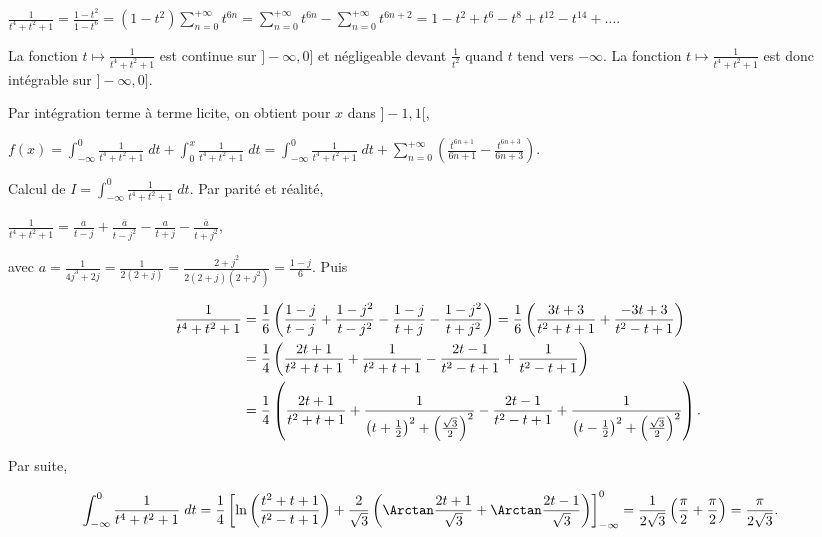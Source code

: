 {{\begin{center}
$\frac{1}{t^4+t^2+1}=\frac{1-t^2}{1-t^6}=(1-t^2)\sum_{n=0}^{+\infty}t^{6n}=\sum_{n=0}^{+\infty}t^{6n}-\sum_{n=0}^{+\infty}t^{6n+2}=1-t^2+t^6-t^8+t^{12}-t^{14}+\ldots$.
\end{center}

La fonction $t\mapsto\frac{1}{t^4+t^2+1}$ est continue sur $]-\infty,0]$ et négligeable devant $\frac{1}{t^2}$ quand $t$ tend vers $-\infty$. La fonction $t\mapsto\frac{1}{t^4+t^2+1}$ est donc intégrable sur $]-\infty,0]$.

Par intégration terme à terme licite, on obtient pour $x$ dans $]-1,1[$,

\begin{center}
$f(x)=\int_{-\infty}^{0}\frac{1}{t^4+t^2+1}\;dt+\int_{0}^{x}\frac{1}{t^4+t^2+1}\;dt=\int_{-\infty}^{0}\frac{1}{t^4+t^2+1}\;dt+\sum_{n=0}^{+\infty}\left(\frac{t^{6n+1}}{6n+1}-\frac{t^{6n+3}}{6n+3}\right)$.
\end{center}

Calcul de $I=\int_{-\infty}^{0}\frac{1}{t^4+t^2+1}\;dt$. Par parité et réalité,

\begin{center}
$\frac{1}{t^4+t^2+1}=\frac{a}{t-j}+\frac{\overline{a}}{t-j^2}-\frac{a}{t+j}-\frac{\overline{a}}{t+j^2}$,
\end{center}

avec $a=\frac{1}{4j^3+2j}=\frac{1}{2(2+j)}=\frac{2+j^2}{2(2+j)(2+j^2)}=\frac{1-j}{6}$.
Puis

\begin{align*}\ensuremath
\frac{1}{t^4+t^2+1}&=\frac{1}{6}\left(\frac{1-j}{t-j}+\frac{1-j^2}{t-j^2}-\frac{1-j}{t+j}-\frac{1-j^2}{t+j^2}\right)=\frac{1}{6}\left(\frac{3t+3}{t^2+t+1}+\frac{-3t+3}{t^2-t+1}\right)\\
 &=\frac{1}{4}\left(\frac{2t+1}{t^2+t+1}+\frac{1}{t^2+t+1}-\frac{2t-1}{t^2-t+1}+\frac{1}{t^2-t+1}\right)\\
 &=\frac{1}{4}\left(\frac{2t+1}{t^2+t+1}+\frac{1}{\left(t+\frac{1}{2}\right)^2+\left(\frac{\sqrt{3}}{2}\right)^2}-\frac{2t-1}{t^2-t+1}+\frac{1}{\left(t-\frac{1}{2}\right)^2+\left(\frac{\sqrt{3}}{2}\right)^2}\right).
\end{align*}

Par suite,

\begin{align*}\ensuremath
\int_{-\infty}^{0}\frac{1}{t^4+t^2+1}\;dt&=\frac{1}{4}\left[\ln\left(\frac{t^2+t+1}{t^2-t+1}\right)+\frac{2}{\sqrt{3}}\left(\Arctan\frac{2t+1}{\sqrt{3}}+\Arctan\frac{2t-1}{\sqrt{3}}\right)\right]_{-\infty}^0=\frac{1}{2\sqrt{3}}\left(\frac{\pi}{2}+\frac{\pi}{2}\right)=\frac{\pi}{2\sqrt{3}}.
\end{align*}

}}
